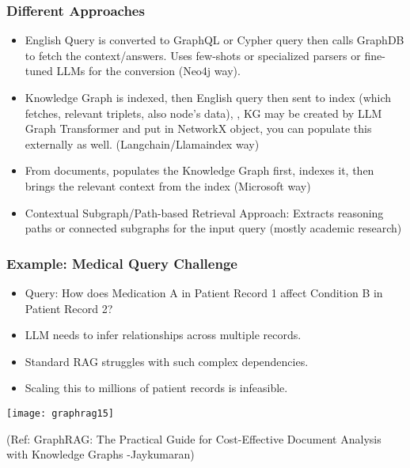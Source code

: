 \begin{frame}[fragile]\frametitle{Different Approaches}


	\begin{itemize}
	\item English Query is converted to GraphQL or Cypher query then calls GraphDB to fetch the context/answers. Uses few-shots or specialized parsers or fine-tuned LLMs for the conversion (Neo4j way). 
	\item Knowledge Graph is indexed, then English query then sent to index (which fetches, relevant triplets, also node's data), , KG may be created by LLM Graph Transformer and put in NetworkX object, you can populate this externally as well. (Langchain/Llamaindex way)
	\item From documents, populates the Knowledge Graph first, indexes it, then brings the relevant context from the index (Microsoft way)
	\item Contextual Subgraph/Path-based Retrieval Approach: Extracts reasoning paths or connected subgraphs for the input query (mostly academic research)
	\end{itemize}

\end{frame}


\begin{frame}[fragile]\frametitle{Example: Medical Query Challenge}
    \begin{itemize}
        \item Query: How does Medication A in Patient Record 1 affect Condition B in Patient Record 2?
        \item LLM needs to infer relationships across multiple records.
        \item Standard RAG struggles with such complex dependencies.
        \item Scaling this to millions of patient records is infeasible.
    \end{itemize}
	
	\begin{center}
	\texttt{[image: graphrag15]}
	
	{\tiny (Ref: GraphRAG: The Practical Guide for Cost-Effective Document Analysis with Knowledge Graphs -Jaykumaran)}
	\end{center}	
\end{frame}



